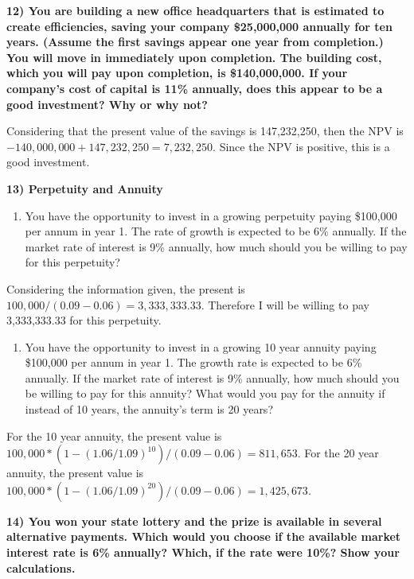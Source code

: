 \documentclass[
  12pt,
]{article}
\providecommand{\tightlist}{%
  \setlength{\itemsep}{0pt}\setlength{\parskip}{0pt}}
\begin{document}
\textbf{12) You are building a new office headquarters that is estimated
to create efficiencies, saving your company \$25,000,000 annually for
ten years. (Assume the first savings appear one year from completion.)
You will move in immediately upon completion. The building cost, which
you will pay upon completion, is \$140,000,000. If your company's cost
of capital is 11\% annually, does this appear to be a good investment?
Why or why not?}

Considering that the present value of the savings is 147,232,250, then
the NPV is \(-140,000,000 + 147,232,250 = 7,232,250\). Since the NPV is
positive, this is a good investment.

\textbf{13) Perpetuity and Annuity}

\begin{enumerate}
\def\labelenumi{\alph{enumi}.}
\tightlist
\item
  You have the opportunity to invest in a growing perpetuity paying
  \$100,000 per annum in year 1. The rate of growth is expected to be
  6\% annually. If the market rate of interest is 9\% annually, how much
  should you be willing to pay for this perpetuity?
\end{enumerate}

Considering the information given, the present is
\(100,000/(0.09-0.06) = 3,333,333.33\). Therefore I will be willing to
pay 3,333,333.33 for this perpetuity.

\begin{enumerate}
\def\labelenumi{\alph{enumi}.}
\setcounter{enumi}{1}
\tightlist
\item
  You have the opportunity to invest in a growing 10 year annuity paying
  \$100,000 per annum in year 1. The growth rate is expected to be 6\%
  annually. If the market rate of interest is 9\% annually, how much
  should you be willing to pay for this annuity? What would you pay for
  the annuity if instead of 10 years, the annuity's term is 20 years?
\end{enumerate}

For the 10 year annuity, the present value is
\(100,000 * (1 - (1.06/1.09)^{10}) / (0.09 - 0.06) = 811,653\). For the
20 year annuity, the present value is
\(100,000 * (1 - (1.06/1.09)^{20}) / (0.09 - 0.06) = 1,425,673\).

\textbf{14) You won your state lottery and the prize is available in
several alternative payments. Which would you choose if the available
market interest rate is 6\% annually? Which, if the rate were 10\%? Show
your calculations.}
\end{document}
